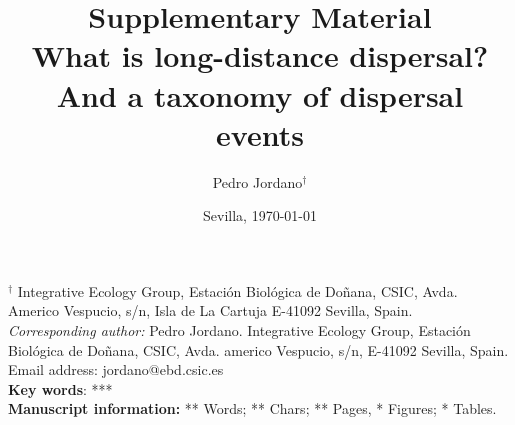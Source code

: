 \documentclass[a4paper, 12pt]{article}
\begin{document}
\title{\textbf{Supplementary Material}\\
\vspace{2cm}
What is long-distance dispersal? And a taxonomy of dispersal events \\
}

\author{Pedro Jordano$^{\dag}$}

\date{Sevilla, \today}
\maketitle


\begin{spacing}{1.0}
$^{\dag}$ {\small Integrative Ecology Group, Estaci\'on Biol\'ogica de 
Do\~nana, CSIC, Avda. Americo Vespucio, s/n, Isla de La Cartuja
E-41092 Sevilla, Spain.}\\


{\small \textit{Corresponding author:} Pedro Jordano. Integrative Ecology Group, Estaci\'on Biol\'ogica de Do\~nana, CSIC, Avda. americo Vespucio, s/n, E-41092 Sevilla, Spain. Email address: jordano@ebd.csic.es}\\

\textbf{Key words}: ***\\

{\small \textbf{Manuscript information: }** Words; ** Chars; ** Pages, * Figures; * Tables.}
\end{spacing}

\maketitle
\newpage
\end{document}

